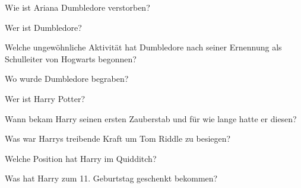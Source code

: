 \documentclass[20pt]{memoir}
\begin{document}
\thispagestyle{empty}
\begin{center}

\begin{vplace}[1]
{\HUGE Wie ist Ariana Dumbledore verstorben?
}
\end{vplace}

\newpage

\begin{vplace}[1]
{\HUGE Wer ist Dumbledore?
}
\end{vplace}

\newpage

\begin{vplace}[1]
{\HUGE Welche ungewöhnliche Aktivität hat Dumbledore nach seiner Ernennung als Schulleiter von Hogwarts begonnen?
}
\end{vplace}

\newpage

\begin{vplace}[1]
{\HUGE Wo wurde Dumbledore begraben?
}
\end{vplace}

\newpage

\begin{vplace}[1]
{\HUGE Wer ist Harry Potter?
}
\end{vplace}

\newpage

\begin{vplace}[1]
{\HUGE Wann bekam Harry seinen ersten Zauberstab und für wie lange hatte er diesen?
}
\end{vplace}

\newpage

\begin{vplace}[1]
{\HUGE Was war Harrys treibende Kraft um Tom Riddle zu besiegen?
}
\end{vplace}

\newpage

\begin{vplace}[1]
{\HUGE Welche Position hat Harry im Quidditch?
}
\end{vplace}

\newpage

\begin{vplace}[1]
{\HUGE Was hat Harry zum 11. Geburtstag geschenkt bekommen?
}
\end{vplace}

\end{center}
\end{document}
